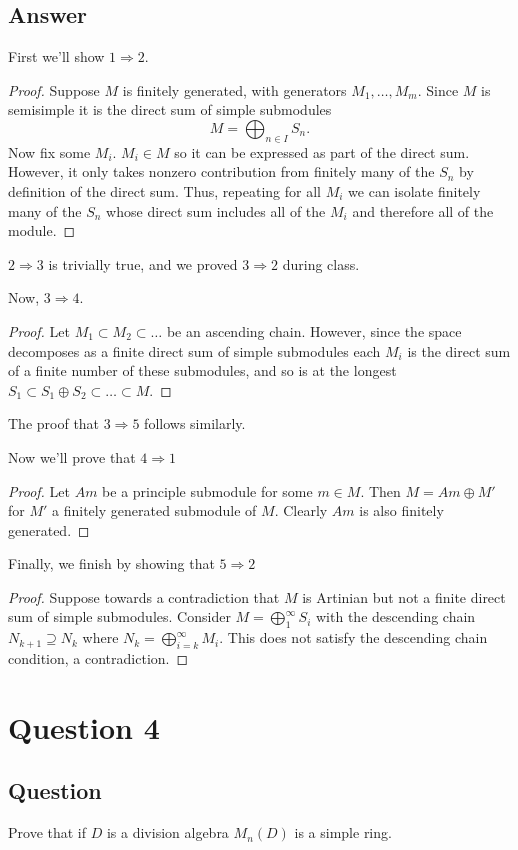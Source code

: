 \documentclass[11pt]{article}
\begin{document}
\subsection{Answer}
First we'll show $1 \Rightarrow 2$.
\begin{proof}
Suppose $M$ is finitely generated, with generators $M_1, \dots, M_m$. Since $M$ is semisimple it is the direct sum of simple submodules
\[M = \bigoplus_{n \in I} S_n.\]
Now fix some $M_i$. $M_i \in M$ so it can be expressed as part of the direct sum. However, it only takes nonzero contribution from finitely  many of the $S_n$ by definition of the direct sum. Thus, repeating for all $M_i$ we can isolate finitely many of the $S_n$ whose direct sum includes all of the $M_i$ and therefore all of the module.\end{proof}

$2 \Rightarrow 3$ is trivially true, and we proved $3 \Rightarrow 2$ during class.

Now, $3 \Rightarrow 4$.
\begin{proof}
Let $M_1 \subset M_2 \subset \dots$ be an ascending chain. However, since the space decomposes as a finite direct sum of simple submodules each $M_i$ is the direct sum of a finite number of these submodules, and so is at the longest
$S_1 \subset S_1 \oplus S_2 \subset \dots \subset M$.
\end{proof}

The proof that $3 \Rightarrow 5$ follows similarly.

Now we'll prove that $4 \Rightarrow 1$
\begin{proof}
Let $Am$ be a principle submodule for some $m \in M$. Then $M = A m \oplus M'$ for $M'$ a finitely generated submodule of $M$. Clearly $Am$ is also finitely generated.
\end{proof}


Finally, we finish by showing that $5 \Rightarrow 2$
\begin{proof}
Suppose towards a contradiction that $M$ is Artinian but not a finite direct sum of simple submodules. Consider $M = \bigoplus_1^\infty S_i$ with the descending chain $N_{k+1} \supseteq N_k$ where $N_k = \bigoplus_{i=k}^\infty M_i$. This does not satisfy the descending chain condition,  a contradiction.
\end{proof}


\section{Question 4}
\subsection{Question}
Prove that if $D$ is a division algebra $M_n(D)$ is a simple ring.
\end{document}

